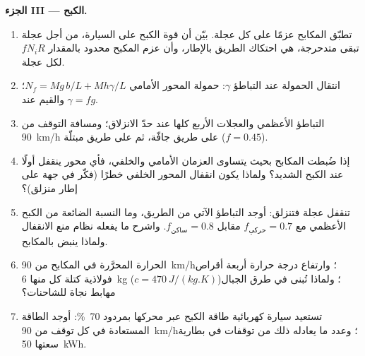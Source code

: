 \begin{problem}
\medskip
\noindent\textbf{الجزء III --- الكبح.}
\begin{enumerate}[resume]
  \item تطبّق المكابح عزمًا على كل عجلة. بيّن أن قوة الكبح على
        السيارة، من أجل عجلة تبقى متدحرجة، هي احتكاك الطريق
        بالإطار، وأن عزم المكبح محدود
        بالمقدار $fN_iR$ لكل عجلة.
  \item انتقال الحمولة عند التباطؤ $\gamma$: حمولة المحور الأمامي
        $N_f = Mg\,b/L + Mh\gamma/L$؛ والقيم عند $\gamma = fg$.
  \item التباطؤ الأعظمي والعجلات الأربع كلها عند حدّ الانزلاق؛
        ومسافة التوقف من \qty{90}{km/h} على طريق جافّة، ثم على
        طريق مبتلّة ($f = 0.45$).
  \item إذا ضُبطت المكابح بحيث يتساوى العزمان الأمامي والخلفي،
        فأي محور ينقفل أولًا عند الكبح الشديد؟ ولماذا يكون
        انقفال المحور الخلفي خطرًا (فكّر في جهة 
        على إطار منزلق)؟
  \item تنقفل عجلة فتنزلق: أوجد التباطؤ الآتي من الطريق، وما
        النسبة الضائعة من الكبح الأعظمي مع $f_{\text{حركي}} =
        0.7$ مقابل $f_{\text{ساكن}} = 0.8$. واشرح ما يفعله نظام
        منع الانقفال ولماذا ينبض بالمكابح.
  \item الحرارة المحرَّرة في المكابح من \qty{90}{km/h}؛ وارتفاع
        درجة حرارة أربعة أقراص فولاذية كتلة كل منها \qty{6}{kg} ($c = \qty{470}{J/(kg.K)}$)؛
        ولماذا تُبنى في طرق الجبال مهابط نجاة للشاحنات؟
  \item تستعيد سيارة كهربائية طاقة الكبح عبر محركها بمردود
        \qty{70}{\%}: أوجد الطاقة المستعادة في كل توقف من
        \qty{90}{km/h}؛ وعدد ما يعادله ذلك من توقفات في بطارية
        سعتها \qty{50}{kWh}.
\end{enumerate}


\end{problem}
